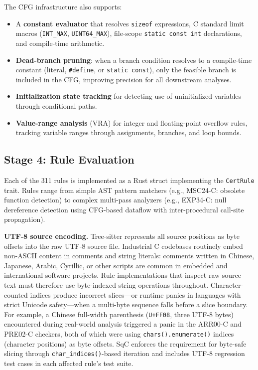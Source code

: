 The CFG infrastructure also supports:
\begin{itemize}
    \item A \textbf{constant evaluator} that resolves \texttt{sizeof}
        expressions, C standard limit macros (\texttt{INT\_MAX},
        \texttt{UINT64\_MAX}), file-scope \texttt{static const int}
        declarations, and compile-time arithmetic.
    \item \textbf{Dead-branch pruning}: when a branch condition
        resolves to a compile-time constant (literal, \texttt{\#define},
        or \texttt{static const}), only the feasible branch is included
        in the CFG, improving precision for all downstream analyses.
    \item \textbf{Initialization state tracking} for detecting
        use of uninitialized variables through conditional paths.
    \item \textbf{Value-range analysis} (VRA) for integer and
        floating-point overflow rules, tracking variable ranges through
        assignments, branches, and loop bounds.
\end{itemize}

\subsection{Stage 4: Rule Evaluation}

Each of the 311 rules is implemented as a Rust struct implementing
the \texttt{CertRule} trait.  Rules range from simple AST pattern
matchers (e.g., MSC24-C: obsolete function detection) to complex
multi-pass analyzers (e.g., EXP34-C: null dereference detection
using CFG-based dataflow with inter-procedural call-site propagation).

\textbf{UTF-8 source encoding.}  Tree-sitter represents all source
positions as byte offsets into the raw UTF-8 source file.  Industrial
C codebases routinely embed non-ASCII content in comments and string
literals: comments written in Chinese, Japanese, Arabic, Cyrillic, or
other scripts are common in embedded and international software
projects.  Rule implementations that inspect raw source text must
therefore use byte-indexed string operations throughout.
Character-counted indices produce incorrect slices---or runtime panics
in languages with strict Unicode safety---when a multi-byte sequence
falls before a slice boundary.  For example, a Chinese full-width
parenthesis (\texttt{U+FF08}, three UTF-8 bytes) encountered during
real-world analysis triggered a panic in the ARR00-C and PRE02-C
checkers, both of which were using \texttt{chars().enumerate()} indices
(character positions) as byte offsets.  SqC enforces the requirement
for byte-safe slicing through \texttt{char\_indices()}-based iteration
and includes UTF-8 regression test cases in each affected rule's test
suite.

